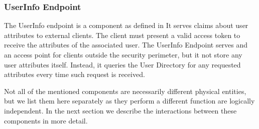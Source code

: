 \subsubsection{UserInfo Endpoint}
The UserInfo endpoint is a component as defined in
It serves claims about user attributes to external clients. The client must present a valid access token to receive the attributes of the associated user. The UserInfo Endpoint serves and an access point for clients outside the security perimeter, but it not store any user attributes itself. Instead, it queries the User Directory for any requested attributes every time such request is received.

\bigskip\noindent
Not all of the mentioned components are necessarily different physical entities, but we list them here separately as they perform a different function are logically independent. In the next section we describe the interactions between these components in more detail.